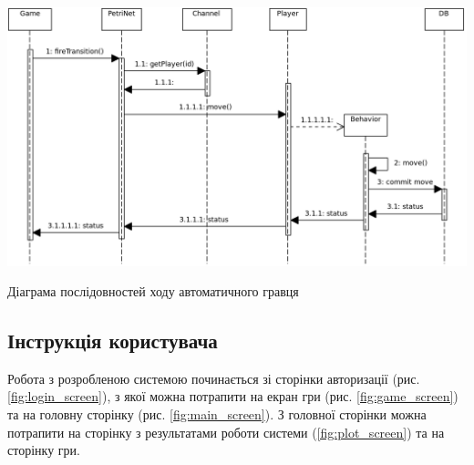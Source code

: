 \begin{stdfigure}
    \includegraphics[width=7in]{images/uml/automate_move.png}
    \caption{Діаграма послідовностей ходу автоматичного гравця}
    \label{fig:uml_auto_move}
\end{stdfigure}   

\subsection{Інструкція користувача}
Робота з розробленою системою починається зі сторінки авторизації (рис. \ref{fig:login_screen}), з якої можна потрапити на екран гри (рис. \ref{fig:game_screen}) та на головну сторінку (рис. \ref{fig:main_screen}). З головної сторінки можна потрапити на сторінку з результатами роботи системи (\ref{fig:plot_screen}) та на сторінку гри. 

